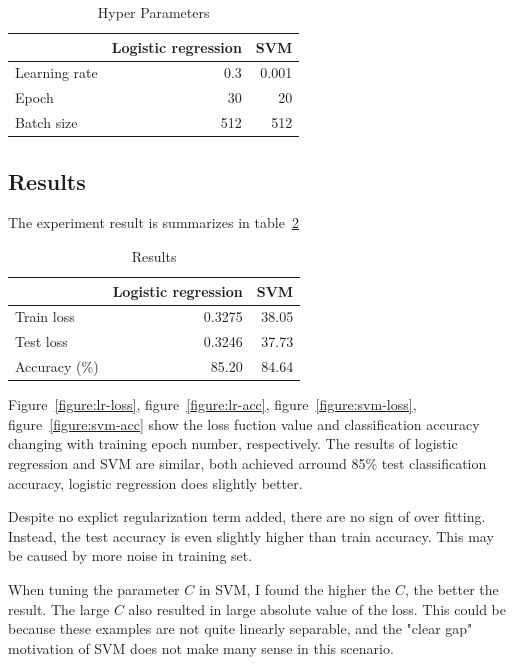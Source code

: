 \documentclass[journal, a4paper]{IEEEtran}
\begin{document}
\begin{table}[htb]
    \centering
    \caption{Hyper Parameters}
    \label{table:hyper-param}
    \begin{tabular}{l|rr}
        \hline
            & Logistic regression & SVM \\
        \hline
        Learning rate & 0.3 & 0.001 \\
        Epoch         & 30  & 20    \\
        Batch size    & 512 & 512   \\
        \hline
    \end{tabular}
\end{table}

\subsection{Results}

The experiment result is summarizes in table~\ref{table:results}

\begin{table}
    \centering
    \caption{Results}
    \label{table:results}
    \begin{tabular}{l|rr}
        \hline
            & Logistic regression & SVM \\
        \hline
        Train loss    & 0.3275 & 38.05 \\
        Test loss     & 0.3246 & 37.73 \\
        Accuracy (\%) & 85.20  & 84.64 \\
    \end{tabular}
\end{table}

Figure~\ref{figure:lr-loss}, figure~\ref{figure:lr-acc}, figure~\ref{figure:svm-loss}, figure~\ref{figure:svm-acc} show the loss fuction value and classification accuracy changing with training epoch number, respectively. The results of logistic regression and SVM are similar, both achieved arround 85\% test classification accuracy, logistic regression does slightly better.

Despite no explict regularization term added, there are no sign of over fitting. Instead, the test accuracy is even slightly higher than train accuracy. This may be caused by more noise in training set.

When tuning the parameter $C$ in SVM, I found the higher the $C$, the better the result. The large $C$ also resulted in large absolute value of the loss. This could be because these examples are not quite linearly separable, and the "clear gap" motivation of SVM does not make many sense in this scenario.
\end{document}
